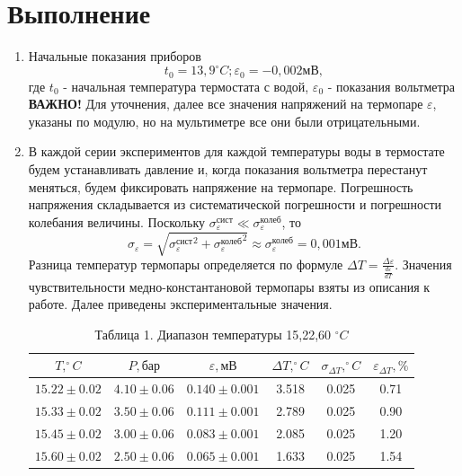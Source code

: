 \documentclass[a4paper]{article}
\begin{document}
\section{Выполнение}
\begin{enumerate}

\item Начальные показания приборов
\begin{equation*}
	t_0 = 13,9 ^\circ C;		\varepsilon_0 = -0,002 \text{мВ},
\end{equation*}
где $t_0$ - начальная температура термостата с водой, $\varepsilon_0$ - показания вольтметра\\
\textbf{ВАЖНО!} Для уточнения, далее все значения напряжений на термопаре $\varepsilon$, указаны по модулю, но на мультиметре все они были отрицательными.

\item В каждой серии экспериментов для каждой температуры воды в термостате будем устанавливать давление и, когда показания вольтметра перестанут меняться, будем фиксировать напряжение на термопаре. Погрешность напряжения складывается из систематической погрешности и погрешности колебания величины. Поскольку $\sigma_\varepsilon ^{\text{сист}} \ll \sigma_\varepsilon ^{\text{колеб}} $, то
\begin{equation*}
	\sigma_\varepsilon = \sqrt{{\sigma_\varepsilon ^{\text{сист}}} ^ 2 + {\sigma_\varepsilon ^{\text{колеб}}} ^ 2} \approx \sigma_\varepsilon ^{\text{колеб}} = 0,001 \text{мВ}.
\end{equation*}
Разница температур термопары определяется по формуле $\Delta T = \frac{\Delta \varepsilon} {\frac{d\varepsilon}{d T}} $. Значения чувствительности медно-константановой термопары взяты из описания к работе.
Далее приведены экспериментальные значения.
\begin{table}[h!]
    \centering
    \begin{tabular}{|c|c|c|c|c|c|}
        \hline
        $T, ^\circ C$ & $P, \text{бар}$ & $\varepsilon, \text{мВ}$ & $\Delta T, ^\circ C$ & $\sigma_{\Delta T}, ^\circ C$ & $\varepsilon_{\Delta T}, \%$ \\
        \hline
        $15.22 \pm 0.02$ & $4.10 \pm 0.06$ & $0.140 \pm 0.001$ & 3.518 & 0.025 & 0.71 \\ \hline
        $15.33 \pm 0.02$ & $3.50 \pm 0.06$ & $0.111 \pm 0.001$ & 2.789 & 0.025 & 0.90 \\ \hline
        $15.45 \pm 0.02$ & $3.00 \pm 0.06$ & $0.083 \pm 0.001$ & 2.085 & 0.025 & 1.20 \\ \hline
        $15.60 \pm 0.02$ & $2.50 \pm 0.06$ & $0.065 \pm 0.001$ & 1.633 & 0.025 & 1.54 \\ \hline
    \end{tabular}
    \caption{Таблица 1. Диапазон температуры 15,22,60 $^\circ C$}
\end{table}


\end{enumerate}
\end{document}
